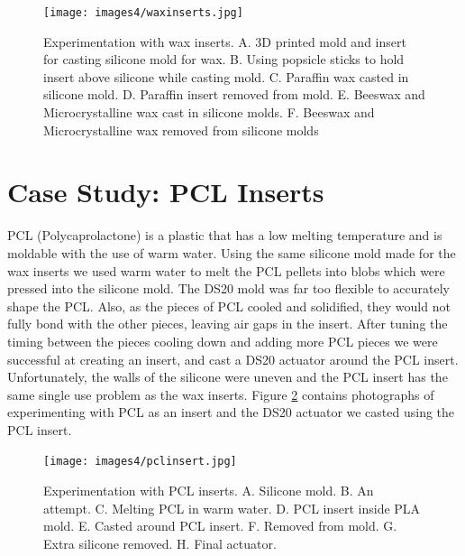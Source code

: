 \begin{figure}[h]
    \centering
    \texttt{[image: images4/waxinserts.jpg]}
    \caption{Experimentation with wax inserts. A. 3D printed mold and insert for casting silicone mold for wax. B. Using popsicle sticks to hold insert above silicone while casting mold. C. Paraffin wax casted in silicone mold. D. Paraffin insert removed from mold. E. Beeswax and Microcrystalline wax cast in silicone molds. F. Beeswax and Microcrystalline wax removed from silicone molds}
    \label{fig:waxinserts}
\end{figure}

\section{Case Study: PCL Inserts}

PCL (Polycaprolactone) is a plastic that has a low melting temperature and is moldable with the use of warm water. Using the same silicone mold made for the wax inserts we used warm water to melt the PCL pellets into blobs which were pressed into the silicone mold. The DS20 mold was far too flexible to accurately shape the PCL. Also, as the pieces of PCL cooled and solidified, they would not fully bond with the other pieces, leaving air gaps in the insert. After tuning the timing between the pieces cooling down and adding more PCL pieces we were successful at creating an insert, and cast a DS20 actuator around the PCL insert. Unfortunately, the walls of the silicone were uneven and the PCL insert has the same single use problem as the wax inserts. Figure \ref{fig:pclinsert} contains photographs of experimenting with PCL as an insert and the DS20 actuator we casted using the PCL insert. 

\begin{figure}[h]
    \centering
    \texttt{[image: images4/pclinsert.jpg]}
    \caption{Experimentation with PCL inserts. A. Silicone mold. B. An attempt. C. Melting PCL in warm water. D. PCL insert inside PLA mold. E. Casted around PCL insert. F. Removed from mold. G. Extra silicone removed. H. Final actuator.}
    \label{fig:pclinsert}
\end{figure}

